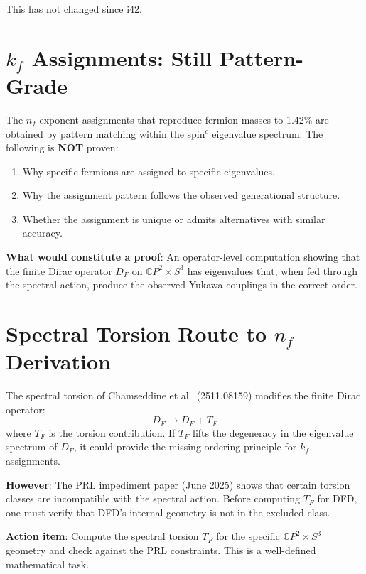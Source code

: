 \documentclass[11pt,a4paper]{article}
\newcommand{\CP}{\mathbb{C}P}
\begin{document}
This has not changed since i42.

\section{$k_f$ Assignments: Still Pattern-Grade}

\begin{tcolorbox}[colback=yellow!5!white, colframe=yellow!60!black,
  title={HONEST STATUS: $k_f$ are pattern-matched, not operator-derived}]

The $n_f$ exponent assignments that reproduce fermion masses to 1.42\% are obtained by pattern matching within the spin$^c$ eigenvalue spectrum. The following is \textbf{NOT} proven:
\begin{enumerate}
\item Why specific fermions are assigned to specific eigenvalues.
\item Why the assignment pattern follows the observed generational structure.
\item Whether the assignment is unique or admits alternatives with similar accuracy.
\end{enumerate}

\textbf{What would constitute a proof}: An operator-level computation showing that the finite Dirac operator $D_F$ on $\CP^2 \times S^3$ has eigenvalues that, when fed through the spectral action, produce the observed Yukawa couplings in the correct order.
\end{tcolorbox}

\section{Spectral Torsion Route to $n_f$ Derivation}

The spectral torsion of Chamseddine et al.\ (2511.08159) modifies the finite Dirac operator:
\begin{equation}
D_F \to D_F + T_F
\end{equation}
where $T_F$ is the torsion contribution. If $T_F$ lifts the degeneracy in the eigenvalue spectrum of $D_F$, it could provide the missing ordering principle for $k_f$ assignments.

\textbf{However}: The PRL impediment paper (June 2025) shows that certain torsion classes are incompatible with the spectral action. Before computing $T_F$ for DFD, one must verify that DFD's internal geometry is not in the excluded class.

\textbf{Action item}: Compute the spectral torsion $T_F$ for the specific $\CP^2 \times S^3$ geometry and check against the PRL constraints. This is a well-defined mathematical task.
\end{document}
